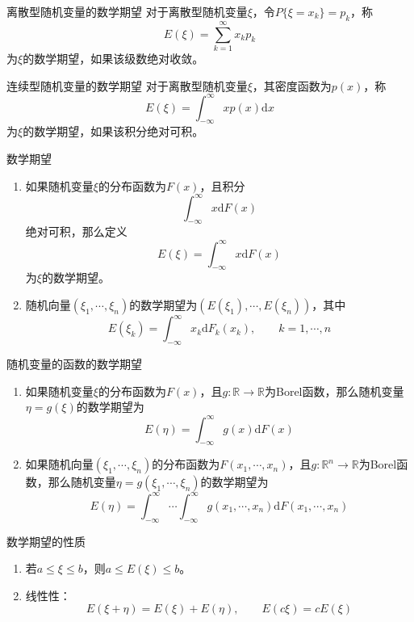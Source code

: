 \documentclass[lang = cn, scheme = chinese, thmcnt = section]{elegantbook}
\newcommand{\R}{\mathbb{R}}            %
\begin{document}
\begin{definition}{离散型随机变量的数学期望}
	对于离散型随机变量$\xi$，令$P\{\xi=x_k\}=p_k$，称
	$$
	E(\xi)=\sum_{k=1}^{\infty}{x_k p_k}
	$$
	为$\xi$的数学期望，如果该级数绝对收敛。
\end{definition}

\begin{definition}{连续型随机变量的数学期望}
	对于离散型随机变量$\xi$，其密度函数为$p(x)$，称
	$$
	E(\xi)=\int_{-\infty}^{\infty}{xp(x)\mathrm{d}x}
	$$
	为$\xi$的数学期望，如果该积分绝对可积。
\end{definition}

\begin{definition}{数学期望}
	\begin{enumerate}
		\item 如果随机变量$\xi$的分布函数为$F(x)$，且积分
		$$
		\int_{-\infty}^{\infty}{x\mathrm{d}F(x)}
		$$
		绝对可积，那么定义
		$$
		E(\xi)=\int_{-\infty}^{\infty}{x\mathrm{d}F(x)}
		$$
		为$\xi$的数学期望。
		\item 随机向量$(\xi_1,\cdots,\xi_n)$的数学期望为$(E(\xi_1),\cdots,E(\xi_n))$，其中
		$$
		E(\xi_k)=\int_{-\infty}^{\infty}{x_k\mathrm{d}F_k(x_k)},\qquad k=1,\cdots,n
		$$
	\end{enumerate}
\end{definition}

\begin{proposition}{随机变量的函数的数学期望}
	\begin{enumerate}
		\item 如果随机变量$\xi$的分布函数为$F(x)$，且$g:\R\to\R$为Borel函数，那么随机变量$\eta=g(\xi)$的数学期望为
		$$
		E(\eta)=\int_{-\infty}^{\infty}{g(x)\mathrm{d}F(x)}
		$$
		\item 如果随机向量$(\xi_1,\cdots,\xi_n)$的分布函数为$F(x_1,\cdots,x_n)$，且$g:\R^n\to\R$为Borel函数，那么随机变量$\eta=g(\xi_1,\cdots,\xi_n)$的数学期望为
		$$
		E(\eta)=\int_{-\infty}^{\infty}\cdots\int_{-\infty}^{\infty}{g(x_1,\cdots,x_n)\mathrm{d}F(x_1,\cdots,x_n)}
		$$
	\end{enumerate}
\end{proposition}

\begin{proposition}{数学期望的性质}
	\begin{enumerate}
		\item 若$a\le\xi\le b$，则$a\le E(\xi)\le b$。
		\item 线性性：
		$$
		E(\xi+\eta)=E(\xi)+E(\eta),\qquad 
		E(c\xi)=cE(\xi)
		$$
	\end{enumerate}
\end{proposition}
\end{document}
